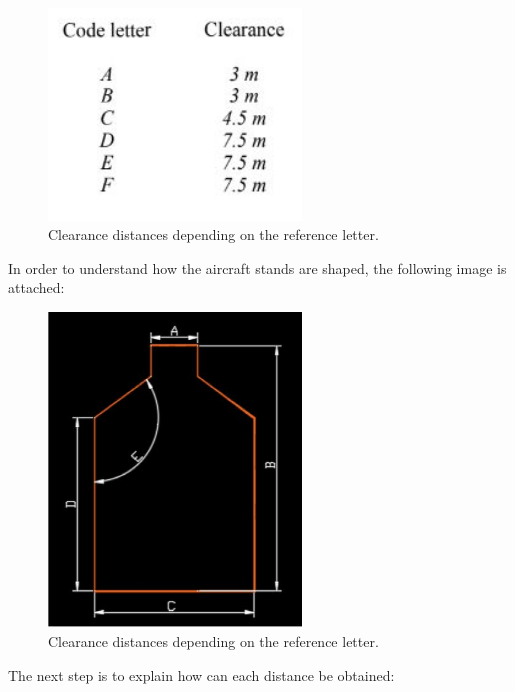 		\begin{figure}[H]
			\centering
			\includegraphics[clip, trim=0cm 0cm 0cm 0cm, width=0.6\textwidth]{./images/Annex14/clearancedistances}
			\caption{Clearance distances depending on the reference letter.} %
			\label{} %
		\end{figure}
		
		In order to understand how the aircraft stands are shaped, the following image is attached:
		
		\begin{figure}[H]
			\centering
			\includegraphics[clip, trim=0cm 0cm 0cm 0cm, width=0.6\textwidth]{./images/Annex14/aircraftstand}
			\caption{Clearance distances depending on the reference letter.} %
			\label{} %
		\end{figure}
		
		The next step is to explain how can each distance be obtained:
		
